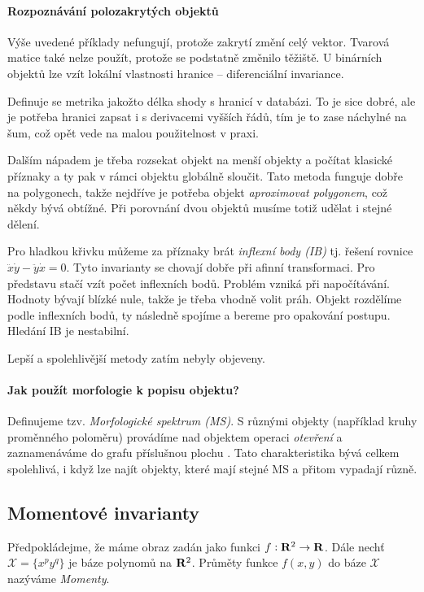 \paragraph{Rozpoznávání polozakrytých objektů}
Výše uvedené příklady nefungují, protože zakrytí změní celý vektor. Tvarová matice také nelze použít, protože se
podstatně změnilo těžiště. U binárních objektů lze vzít lokální vlastnosti hranice -- diferenciální invariance.

Definuje se metrika jakožto délka shody s hranicí v databázi. To je sice dobré, ale je potřeba hranici zapsat i s 
derivacemi vyšších řádů, tím je to zase náchylné na šum, což opět vede na malou použitelnost v praxi.

Dalším nápadem je třeba rozsekat objekt na menší objekty a počítat klasické příznaky a ty pak v rámci objektu globálně 
sloučit. Tato metoda funguje dobře na polygonech, takže nejdříve je potřeba objekt {\em aproximovat polygonem}, což
někdy bývá obtížné. Při porovnání dvou objektů musíme totiž udělat i stejné dělení.

Pro hladkou křivku můžeme za příznaky brát {\em inflexní body (IB)} tj. řešení rovnice $\ddot{x}\dot{y}-\ddot{y}\dot{x}=0$.
Tyto invarianty se chovají dobře při afinní transformaci. Pro představu stačí vzít počet inflexních bodů.
Problém vzniká při napočítávání. Hodnoty bývají blízké nule, takže je třeba vhodně volit práh. Objekt rozdělíme podle 
inflexních bodů, ty následně spojíme a bereme  pro opakování postupu. Hledání IB je nestabilní.

Lepší a spolehlivější metody zatím nebyly objeveny.

\paragraph{Jak použít morfologie k popisu objektu?} Definujeme tzv. {\em Morfologické spektrum (MS)}. S různými objekty (například
kruhy proměnného poloměru) provádíme nad objektem operaci {\em otevření} a zaznamenáváme do grafu příslušnou plochu .
Tato charakteristika bývá celkem spolehlivá, i když lze najít objekty, které mají stejné MS a přitom vypadají různě. 


\subsection{Momentové invarianty}
Předpokládejme, že máme obraz zadán jako funkci $f:\mathbf{R}^2\rightarrow \mathbf{R} $.
Dále nechť $\mathcal{X}=\{x^py^q\}$ je báze polynomů na $\mathbf{R}^2$. Průměty funkce $f(x,y)$ do báze $\mathcal{X}$ nazýváme
{\em Momenty}.

